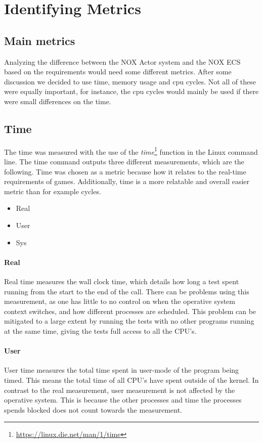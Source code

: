 \section{Identifying Metrics}

\subsection{Main metrics}
Analyzing the difference between the NOX Actor system and the NOX ECS based on the requirements would need some different metrics.
After some discussion we decided to use time, memory usage and cpu cycles.
Not all of these were equally important, for instance, the cpu cycles would mainly be used if there were small differences on the time.

\subsection{Time}
The time was measured with the use of the \emph{time}\footnote{\url{https://linux.die.net/man/1/time}} function in the Linux command line.
The time command outputs three different measurements, which are the following\cite{stack_overflow_time_output}.
Time was chosen as a metric because how it relates to the real-time requirements of games.
Additionally, time is a more relatable and overall easier metric than for example cycles.

\begin{itemize}
    \item Real
    \item User
    \item Sys
\end{itemize}

\paragraph{Real}
Real time measures the wall clock time, which details how long a test spent running from the start to the end of the call.
There can be problems using this measurement, as one has little to no control on when the operative system context switches, and how different processes are scheduled.
This problem can be mitigated to a large extent by running the tests with no other programs running at the same time, giving the tests full access to all the CPU's.

\paragraph{User}
User time measures the total time spent in user-mode of the program being timed.
This means the total time of all CPU's have spent outside of the kernel.
In contrast to the real measurement, user measurement is not affected by the operative system.
This is because the other processes and time the processes spends blocked does not count towards the measurement.

